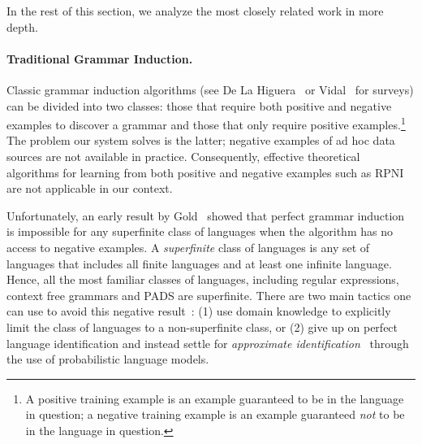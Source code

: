 \noindent
In the rest of this section, we analyze
the most closely related work in more depth.

\paragraph*{Traditional Grammar Induction.}
Classic grammar induction algorithms (see De La
Higuera~\cite{higuera01current} or Vidal~\cite{vidal:gisurvey} for
surveys) can be divided into two classes: those that require both
positive and negative examples to discover a grammar and those that
only require positive examples.\footnote{A positive training example
is an example guaranteed to be in the language in question; a negative
training example is an example guaranteed {\em not} to be in the
language in question.}  The problem our system solves is the latter;
negative examples of ad hoc data sources are not available in
practice.  Consequently, effective theoretical algorithms for learning
from both positive and negative
examples such as RPNI~\cite{rpni}
are not applicable in our context.

Unfortunately, an early result by Gold~\cite{gold:inference} showed
that perfect grammar induction is impossible for any superfinite class
of languages when the algorithm has no access to negative examples.  A
{\em superfinite} class of languages is any set of languages that
includes all finite languages and at least one infinite
language. Hence, all the most familiar classes of languages, including
regular expressions, context free grammars and PADS are superfinite.
There are two main tactics one can use to avoid this negative
result~\cite{vidal:gisurvey}: 
(1) use domain knowledge to explicitly limit the class of languages to a
non-superfinite class, or
(2) give up on perfect language identification and instead settle for {\em approximate
identification}~\cite{wharton:approximate-language-identification}
through the use of probabilistic language models.

